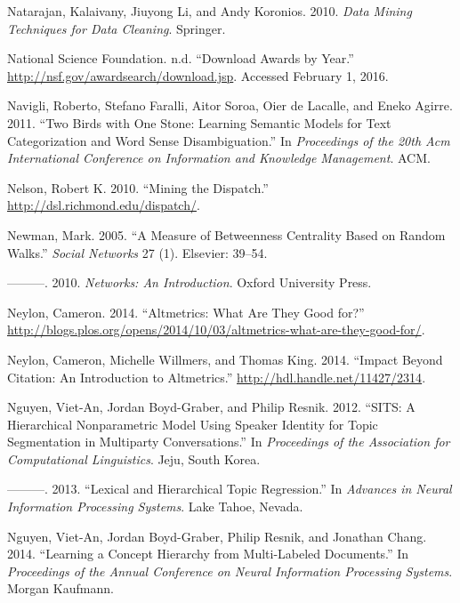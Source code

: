 \documentclass[]{krantz}
\begin{document}
\hypertarget{ref-natarajan2010data}{}
Natarajan, Kalaivany, Jiuyong Li, and Andy Koronios. 2010. \emph{Data
Mining Techniques for Data Cleaning}. Springer.

\hypertarget{ref-nsfweb}{}
National Science Foundation. n.d. ``Download Awards by Year.''
\url{http://nsf.gov/awardsearch/download.jsp}. Accessed February 1,
2016.

\hypertarget{ref-navigli-11}{}
Navigli, Roberto, Stefano Faralli, Aitor Soroa, Oier de Lacalle, and
Eneko Agirre. 2011. ``Two Birds with One Stone: Learning Semantic Models
for Text Categorization and Word Sense Disambiguation.'' In
\emph{Proceedings of the 20th Acm International Conference on
Information and Knowledge Management}. ACM.

\hypertarget{ref-nelson-10}{}
Nelson, Robert K. 2010. ``Mining the Dispatch.''
\url{http://dsl.richmond.edu/dispatch/}.

\hypertarget{ref-newman2005measure}{}
Newman, Mark. 2005. ``A Measure of Betweenness Centrality Based on
Random Walks.'' \emph{Social Networks} 27 (1). Elsevier: 39--54.

\hypertarget{ref-newman2010networks}{}
---------. 2010. \emph{Networks: An Introduction}. Oxford University
Press.

\hypertarget{ref-neylon2014plosaltmetrics}{}
Neylon, Cameron. 2014. ``Altmetrics: What Are They Good for?''
\url{http://blogs.plos.org/opens/2014/10/03/altmetrics-what-are-they-good-for/}.

\hypertarget{ref-neylon2014scap}{}
Neylon, Cameron, Michelle Willmers, and Thomas King. 2014. ``Impact
Beyond Citation: An Introduction to Altmetrics.''
\url{http://hdl.handle.net/11427/2314}.

\hypertarget{ref-nguyen-12}{}
Nguyen, Viet-An, Jordan Boyd-Graber, and Philip Resnik. 2012. ``SITS: A
Hierarchical Nonparametric Model Using Speaker Identity for Topic
Segmentation in Multiparty Conversations.'' In \emph{Proceedings of the
Association for Computational Linguistics}. Jeju, South Korea.

\hypertarget{ref-nguyen-13:shlda}{}
---------. 2013. ``Lexical and Hierarchical Topic Regression.'' In
\emph{Advances in Neural Information Processing Systems}. Lake Tahoe,
Nevada.

\hypertarget{ref-Nguyen:Boyd-Graber:Resnik:Chang-2014}{}
Nguyen, Viet-An, Jordan Boyd-Graber, Philip Resnik, and Jonathan Chang.
2014. ``Learning a Concept Hierarchy from Multi-Labeled Documents.'' In
\emph{Proceedings of the Annual Conference on Neural Information
Processing Systems}. Morgan Kaufmann.
\end{document}
